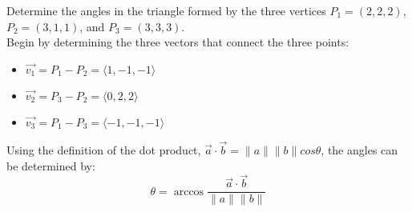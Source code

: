 Determine the angles in the triangle formed by the three vertices $P_1=\left(2,2,2\right)$, $P_2=\left(3,1,1\right)$, and $P_3=\left(3,3,3\right)$.\\

\noindent Begin by determining the three vectors that connect the three points:
	\begin{itemize}
		\item $\vec{v_1}=P_1-P_2=\langle1,-1,-1\rangle$
		\item $\vec{v_2}=P_3-P_2=\langle0,2,2\rangle$
		\item $\vec{v_3}=P_1-P_3=\langle-1,-1,-1\rangle$
	\end{itemize}
Using the definition of the dot product, $\vec{a}\cdot\vec{b}=\|a\|\|b\|cos\theta$, the angles can be determined by:
\begin{equation}
	\theta=\arccos \frac{\vec{a} \cdot \vec{b}} {\|a\|\|b\|}	
\end{equation}
		
